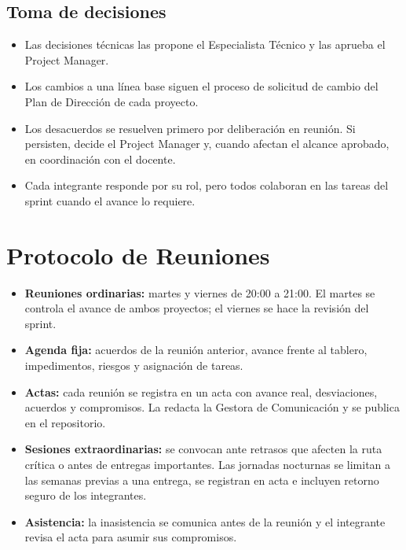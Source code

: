 \documentclass[11pt,a4paper]{article}
\begin{document}
\subsection{Toma de decisiones}
\begin{itemize}[leftmargin=*]
    \item Las decisiones técnicas las propone el Especialista Técnico y las aprueba el Project Manager.
    \item Los cambios a una línea base siguen el proceso de solicitud de cambio del Plan de Dirección de cada proyecto.
    \item Los desacuerdos se resuelven primero por deliberación en reunión. Si persisten, decide el Project Manager y, cuando afectan el alcance aprobado, en coordinación con el docente.
    \item Cada integrante responde por su rol, pero todos colaboran en las tareas del sprint cuando el avance lo requiere.
\end{itemize}

\section{Protocolo de Reuniones}
\begin{itemize}[leftmargin=*]
    \item \textbf{Reuniones ordinarias:} martes y viernes de 20:00 a 21:00. El martes se controla el avance de ambos proyectos; el viernes se hace la revisión del sprint.
    \item \textbf{Agenda fija:} acuerdos de la reunión anterior, avance frente al tablero, impedimentos, riesgos y asignación de tareas.
    \item \textbf{Actas:} cada reunión se registra en un acta con avance real, desviaciones, acuerdos y compromisos. La redacta la Gestora de Comunicación y se publica en el repositorio.
    \item \textbf{Sesiones extraordinarias:} se convocan ante retrasos que afecten la ruta crítica o antes de entregas importantes. Las jornadas nocturnas se limitan a las semanas previas a una entrega, se registran en acta e incluyen retorno seguro de los integrantes.
    \item \textbf{Asistencia:} la inasistencia se comunica antes de la reunión y el integrante revisa el acta para asumir sus compromisos.
\end{itemize}
\end{document}
